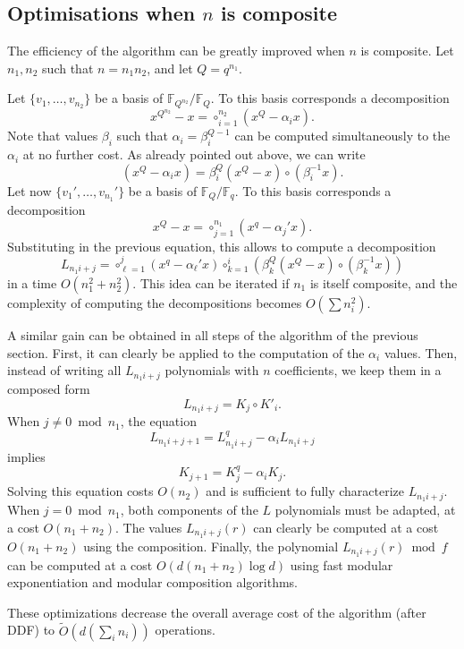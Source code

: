 \documentclass{sig-alternate}
\newcounter{algo}
\begin{document}
\subsection{Optimisations when $n$ is composite}

The efficiency of the algorithm can be greatly improved when $n$ is composite. Let $n_1,n_2$ such that  $n=n_1n_2$, and let $Q=q^{n_1}$.

Let $\{v_1,\ldots,v_{n_2}\}$ be a basis of $\mathbb{F}_{Q^{n_2}}/\mathbb{F}_{Q}$. To this basis corresponds a decomposition
$$x^{Q^{n_2}}-x=\circ_{i=1}^{n_2} (x^{Q}-\alpha_i x).$$
Note that values $\beta_i$ such that $\alpha_i=\beta_i^{Q-1}$ can be computed simultaneously to the $\alpha_i$ at no further cost. As already pointed out above, we can write 
$$(x^Q-\alpha_i x)= \beta_i^Q(x^Q-x)\circ(\beta_i^{-1}x).$$
%
Let now $\{v_1',\ldots,v_{n_1}'\}$ be a basis of $\mathbb{F}_{Q}/\mathbb{F}_{q}$. To this basis corresponds a decomposition
$$x^{Q}-x=\circ_{j=1}^{n_1} (x^{q}-\alpha_j' x).$$
Substituting in the previous equation, this allows to compute a decomposition
$$L_{n_1i+j}=\circ_{\ell=1}^j(x^{q}-\alpha_\ell' x) \circ_{k=1}^i \left(\beta_k^Q(x^Q-x)\circ(\beta_k^{-1}x)\right)$$
 in a time $O(n_1^2+n_2^2)$. This idea can be iterated if $n_1$ is itself composite, and the complexity of computing the decompositions becomes $O(\sum n_i^2)$.
 
A similar gain can be obtained in all steps of the algorithm of the previous section. First, it can clearly be applied to the computation of the $\alpha_i$ values. Then, instead of writing all $L_{n_1i+j}$ polynomials with $n$ coefficients, we keep them in a composed form
$$L_{n_1i+j}=K_j\circ K'_i.$$
When $j\neq0\bmod n_1$, the equation
$$L_{n_1i+j+1}=L_{n_1i+j}^q-\alpha_iL_{n_1i+j}$$
implies
$$K_{j+1}=K_{j}^q-\alpha_iK_{j}.$$
Solving this equation costs $O(n_2)$ and is sufficient to fully characterize $L_{n_1i+j}$.
%
When $j=0\bmod n_1$, both components of the $L$ polynomials must be adapted, at a cost $O(n_1+n_2)$.
%
The values $L_{n_1i+j}(r)$ can clearly be computed at a cost $O(n_1+n_2)$ using the composition.
%
Finally, the polynomial $L_{n_1i+j}(r)\bmod f$ can be computed at a cost $O(d(n_1+n_2)\log d)$ using fast modular exponentiation and modular composition algorithms.

These optimizations decrease the overall average cost of the algorithm (after DDF) to $\tilde O(d(\sum_in_i))$ operations. 
\end{document}
